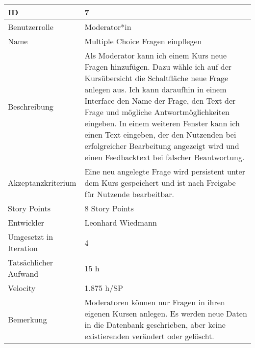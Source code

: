 \begin{tabularx}{\textwidth}{|p{}|X|}
	\hline
	ID & 7\\
	\hline
	Benutzerrolle & Moderator*in\\
	\hline
	Name & Multiple Choice Fragen einpflegen\\
	\hline
	Beschreibung & Als Moderator kann ich einem Kurs neue Fragen hinzufügen. Dazu wähle ich auf der Kursübersicht die Schaltfläche neue Frage anlegen aus. Ich kann daraufhin in einem Interface den Name der Frage, den Text der Frage und mögliche Antwortmöglichkeiten eingeben. In einem weiteren Fenster kann ich einen Text eingeben, der den Nutzenden bei erfolgreicher Bearbeitung angezeigt wird und einen Feedbacktext bei falscher Beantwortung.\\
	\hline
	Akzeptanzkriterium & Eine neu angelegte Frage wird persistent unter dem Kurs gespeichert und ist nach Freigabe für Nutzende bearbeitbar.\\
	\hline
	Story Points & 8 Story Points\\
	\hline
	Entwickler & Leonhard Wiedmann\\
	\hline
	Umgesetzt in Iteration & 4\\
	\hline
	Tatsächlicher Aufwand & 15 h\\
	\hline
	Velocity & 1.875 h/SP\\
	\hline
	Bemerkung & Moderatoren können nur Fragen in ihren eigenen Kursen anlegen. Es werden neue Daten in die Datenbank geschrieben, aber keine existierenden verändert oder gelöscht.\\
	\hline
\end{tabularx}
\vspace{20pt}
